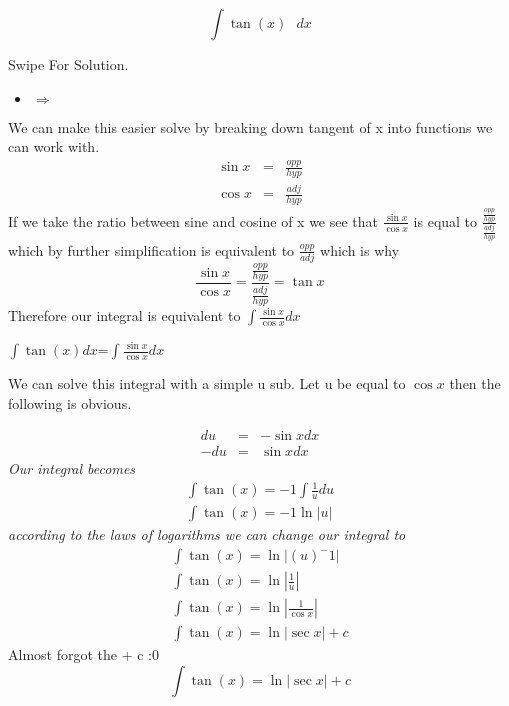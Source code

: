 \documentclass{article}
\begin{document}
\begin{center}
 \Huge
 \begin{equation}
  \int\tan{(x)} \text{ $dx$} \nonumber   
 \end{equation}

 \end{center}
\begin{center}
\newline
\newline
 \Huge Swipe For Solution. 
 \end{center}
\begin{itemize}
\centering \color{red}\Huge \item $\Rightarrow$  
\end{itemize}
\newpage
\normalsize
We can make this easier solve by breaking down tangent of x into functions we can work with.
\begin{eqnarray}
\sin{x} &=& \frac{opp}{hyp}\nonumber \\
\cos{x} &=& \frac{adj}{hyp} \nonumber
\end{eqnarray}
If we take the ratio between sine and cosine of x we see that $\frac{\sin{x}}{\cos{x}}$ is equal to $\frac{\frac{opp}{hyp}}{\frac{adj}{hyp}}$ which by further simplification is equivalent to $\frac{opp}{adj}$ which is why
\begin{equation}
    \frac{\sin{x}}{\cos{x}} = \frac{\frac{opp}{hyp}}{\frac{adj}{hyp}} = \tan{x} \nonumber
\end{equation}
Therefore our integral is equivalent to $\int\frac{\sin{x}}{\cos{x}}dx$
\newpage
\begin{center}
$\int\tan{(x)} dx$=$\int\frac{\sin{x}}{\cos{x}}dx$    
\end{center}
We can solve this integral with a simple u sub.
Let u be equal to $\cos{x}$ then the following is obvious.

\begin{eqnarray}
du &=& -\sin{x}dx \nonumber \\
-du & = & \sin{x}dx \nonumber
\end{eqnarray}
\textit{Our integral becomes}
\begin{eqnarray}
\int\tan{(x)} = -1\int\frac{1}{u}du \nonumber \\
\int\tan{(x)} = -1\ln{|u|} \nonumber
\end{eqnarray}
\textit{according to the laws of logarithms we can change our integral to}
\begin{eqnarray}
\int\tan{(x)} = \ln{|(u)^-1|} \nonumber\\
\int\tan{(x)} = \ln{|\frac{1}{u}|}\nonumber\\
\int\tan{(x)} = \ln{|\frac{1}{\cos{x}}|}\nonumber\\
\int\tan{(x)} =  \ln{|\sec{x}|}+c \nonumber
\end{eqnarray}
Almost forgot the + c :0
\newpage
\Huge
\begin{equation}
 \int\tan{(x)} =  \ln{|\sec{x}|}+c \nonumber
\end{equation}
\end{document}

